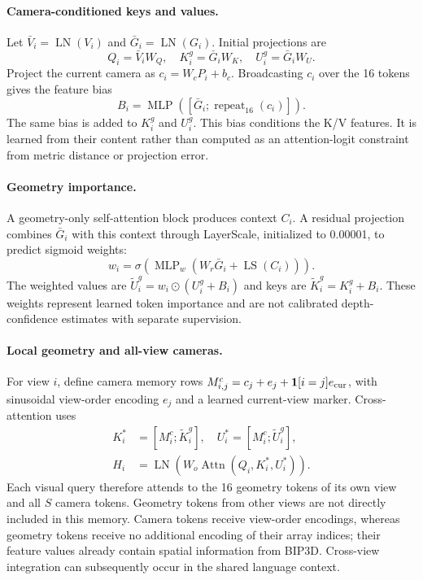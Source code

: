 \paragraph{Camera-conditioned keys and values.}
Let $\bar V_i=\operatorname{LN}(V_i)$ and $\bar G_i=\operatorname{LN}(G_i)$. Initial projections are
\begin{equation}
Q_i=\bar V_iW_Q,\quad K_i^g=\bar G_iW_K,\quad U_i^g=\bar G_iW_U.
\end{equation}
Project the current camera as $c_i=W_cP_i+b_c$. Broadcasting $c_i$ over the 16 tokens gives the feature bias
\begin{equation}
B_i=\operatorname{MLP}([\bar G_i;\operatorname{repeat}_{16}(c_i)]).
\end{equation}
The same bias is added to $K_i^g$ and $U_i^g$. This bias conditions the K/V features. It is learned from their content rather than computed as an attention-logit constraint from metric distance or projection error.

\paragraph{Geometry importance.}
A geometry-only self-attention block produces context $C_i$. A residual projection combines $\bar G_i$ with this context through LayerScale, initialized to 0.00001, to predict sigmoid weights:
\begin{equation}
w_i=\sigma\!\left(\operatorname{MLP}_w(W_r\bar G_i+\operatorname{LS}(C_i))\right).
\end{equation}
The weighted values are $\widetilde U_i^g=w_i\odot(U_i^g+B_i)$ and keys are $\widetilde K_i^g=K_i^g+B_i$. These weights represent learned token importance and are not calibrated depth-confidence estimates with separate supervision.

\paragraph{Local geometry and all-view cameras.}
For view $i$, define camera memory rows $M^c_{i,j}=c_j+e_j+\mathbf{1}[i=j]e_{\rm cur}$, with sinusoidal view-order encoding $e_j$ and a learned current-view marker. Cross-attention uses
\begin{align}
K_i^*&=[M_i^c;\widetilde K_i^g],\quad U_i^*=[M_i^c;\widetilde U_i^g],\\
H_i&=\operatorname{LN}\!\left(W_o\operatorname{Attn}(Q_i,K_i^*,U_i^*)\right).
\end{align}
Each visual query therefore attends to the 16 geometry tokens of its own view and all $S$ camera tokens. Geometry tokens from other views are not directly included in this memory. Camera tokens receive view-order encodings, whereas geometry tokens receive no additional encoding of their array indices; their feature values already contain spatial information from BIP3D. Cross-view integration can subsequently occur in the shared language context.

